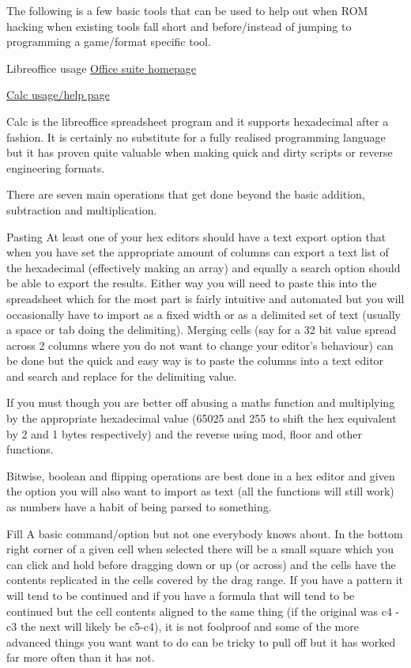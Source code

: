 \documentclass[
]{book}
\begin{document}
The following is a few basic tools that can be used to help out when ROM hacking when existing tools fall short and before/instead of jumping to programming a game/format specific tool.

Libreoffice usage \href{http://www.libreoffice.org/}{Office suite homepage}

\href{http://help.libreoffice.org/Calc/Welcome_to_the_Calc_Help}{Calc usage/help page}

Calc is the libreoffice spreadsheet program and it supports hexadecimal after a fashion. It is certainly no substitute for a fully realised programming language but it has proven quite valuable when making quick and dirty scripts or reverse engineering formats.

There are seven main operations that get done beyond the basic addition, subtraction and multiplication.

Pasting At least one of your hex editors should have a text export option that when you have set the appropriate amount of columns can export a text list of the hexadecimal (effectively making an array) and equally a search option should be able to export the results. Either way you will need to paste this into the spreadsheet which for the most part is fairly intuitive and automated but you will occasionally have to import as a fixed width or as a delimited set of text (usually a space or tab doing the delimiting). Merging cells (say for a 32 bit value spread across 2 columns where you do not want to change your editor's behaviour) can be done but the quick and easy way is to paste the columns into a text editor and search and replace for the delimiting value.

If you must though you are better off abusing a maths function and multiplying by the appropriate hexadecimal value (65025 and 255 to shift the hex equivalent by 2 and 1 bytes respectively) and the reverse using mod, floor and other functions.

Bitwise, boolean and flipping operations are best done in a hex editor and given the option you will also want to import as text (all the functions will still work) as numbers have a habit of being parsed to something.

Fill A basic command/option but not one everybody knows about. In the bottom right corner of a given cell when selected there will be a small square which you can click and hold before dragging down or up (or across) and the cells have the contents replicated in the cells covered by the drag range. If you have a pattern it will tend to be continued and if you have a formula that will tend to be continued but the cell contents aligned to the same thing (if the original was c4 - c3 the next will likely be c5-c4), it is not foolproof and some of the more advanced things you want want to do can be tricky to pull off but it has worked far more often than it has not.
\end{document}
